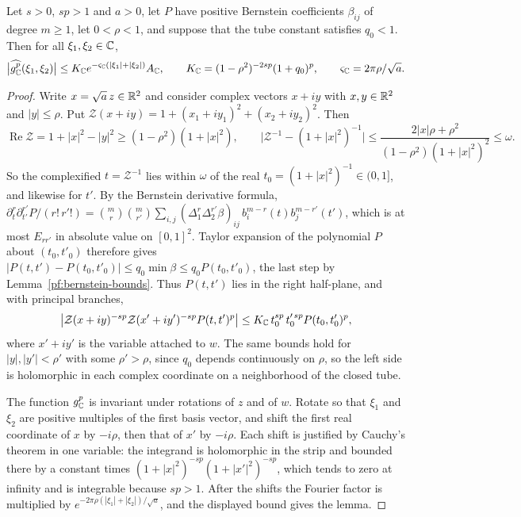 \begin{lemma}\label{pf:tube}
Let $s>0$, $sp>1$ and $a>0$, let $P$ have positive Bernstein coefficients
$\beta_{ij}$ of degree $m\ge1$, let $0<\rho<1$, and suppose that the tube
constant satisfies $q_0<1$. Then for all $\xi_1,\xi_2\in\mathbb C$,
\[
 \bigl|\widehat{g_\mathbb C^p}(\xi_1,\xi_2)\bigr|
 \le K_\mathbb C e^{-\varsigma_\mathbb C(|\xi_1|+|\xi_2|)}A_\mathbb C,\qquad
 K_\mathbb C=(1-\rho^2)^{-2sp}(1+q_0)^p,\qquad
 \varsigma_\mathbb C=2\pi\rho/\sqrt a .
\]
\end{lemma}

\begin{proof}
Write $x=\sqrt a\,z\in\mathbb R^2$ and consider complex vectors $x+iy$ with
$x,y\in\mathbb R^2$ and $|y|\le\rho$. Put
$\mathcal Z(x+iy)=1+(x_1+iy_1)^2+(x_2+iy_2)^2$. Then
\[
 \operatorname{Re}\mathcal Z=1+|x|^2-|y|^2\ge(1-\rho^2)(1+|x|^2),\qquad
 \bigl|\mathcal Z^{-1}-(1+|x|^2)^{-1}\bigr|
 \le\frac{2|x|\rho+\rho^2}{(1-\rho^2)(1+|x|^2)^2}\le\omega .
\]
So the complexified $t=\mathcal Z^{-1}$ lies within $\omega$ of the real
$t_0=(1+|x|^2)^{-1}\in(0,1]$, and likewise for $t'$. By the Bernstein
derivative formula,
$\partial_t^r\partial_{t'}^{r'}P/(r!\,r'!)=\binom mr\binom m{r'}
\sum_{i,j}(\Delta_1^r\Delta_2^{r'}\beta)_{ij}\,b_i^{m-r}(t)b_j^{m-r'}(t')$,
which is at most $E_{rr'}$ in absolute value on $[0,1]^2$. Taylor
expansion of the polynomial $P$ about $(t_0,t'_0)$ therefore gives
$|P(t,t')-P(t_0,t'_0)|\le q_0\min\beta\le q_0P(t_0,t'_0)$, the last step by
Lemma~\ref{pf:bernstein-bounds}. Thus
$P(t,t')$ lies in the right half-plane, and with principal branches,
\[
 \bigl|\mathcal Z(x+iy)^{-sp}\mathcal Z(x'+iy')^{-sp}P(t,t')^p\bigr|
 \le K_\mathbb C\,t_0^{sp}\,t_0'^{\,sp}P(t_0,t'_0)^p ,
\]
where $x'+iy'$ is the variable attached to $w$. The same bounds hold
for $|y|,|y'|<\rho'$ with some $\rho'>\rho$, since $q_0$ depends
continuously on $\rho$, so the left side is holomorphic in each complex
coordinate on a neighborhood of the closed tube.

The function $g_\mathbb C^p$ is invariant under rotations of $z$ and of $w$.
Rotate so that $\xi_1$ and $\xi_2$ are positive multiples of the first
basis vector, and shift the first real coordinate of $x$ by $-i\rho$,
then that of $x'$ by $-i\rho$. Each shift is justified by Cauchy's
theorem in one variable: the integrand is holomorphic in the strip and
bounded there by a constant times $(1+|x|^2)^{-sp}(1+|x'|^2)^{-sp}$,
which tends to zero at infinity and is integrable because $sp>1$. After
the shifts the Fourier factor is multiplied by
$e^{-2\pi\rho(|\xi_1|+|\xi_2|)/\sqrt a}$, and the displayed bound gives
the lemma.
\end{proof}

